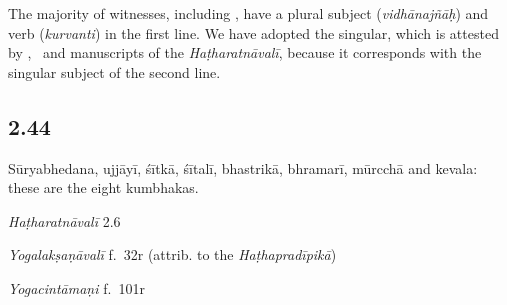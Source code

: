 \begin{ekdosis}
\begin{testimonia}[hp02_043]
\begin{versinnote}
\end{versinnote}
\end{testimonia}

\begin{philcomm}[hp02_043]
The majority of witnesses, including \alphaTwo, have a plural subject (\emph{vidhānajñāḥ}) and verb (\emph{kurvanti}) in the first line. We have adopted the singular, which is attested by \alphaOne, \alphaThree\ and manuscripts of the \emph{Haṭharatnāvalī}, because it corresponds with the singular subject of the second line. 
\end{philcomm}

\subsection*{2.44}
\begin{translation}[hp02_044]
Sūryabhedana, ujjāyī, śītkā, śītalī, bhastrikā, bhramarī, mūrcchā and kevala: these are the eight kumbhakas.
\end{translation}

\begin{sources}[hp02_044]
\end{sources}


\begin{testimonia}[hp02_044]

\emph{Haṭharatnāvalī} 2.6
\begin{versinnote}
\end{versinnote}

\emph{Yogalakṣaṇāvalī} f.~32r (attrib. to the \emph{Haṭhapradīpikā})
\begin{versinnote}
\end{versinnote}

\emph{Yogacintāmaṇi} f.~101r


\end{testimonia}
\end{ekdosis}
